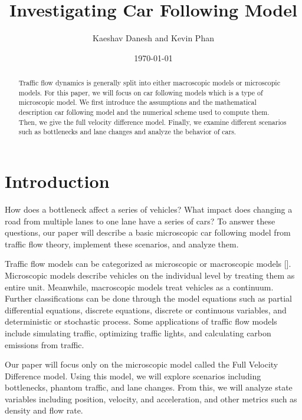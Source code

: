 \documentclass[12pt]{article}
\title{Investigating Car Following Model}
\author{Kaeshav Danesh and Kevin Phan}
\date{\today}
\begin{document}
    \maketitle

    \begin{abstract}
        Traffic flow dynamics is generally split into either macroscopic models or microscopic models. For this paper, we will focus on car following models which is a type of microscopic model. We first introduce the assumptions and the mathematical description car following model and the numerical scheme used to compute them. Then, we give the full velocity difference model. Finally, we examine different scenarios such as bottlenecks and lane changes and analyze the behavior of cars. 
    \end{abstract}

    \newpage

    \tableofcontents

    \newpage

    \section{Introduction}
    How does a bottleneck affect a series of vehicles? What impact does changing a road from multiple lanes to one lane have a series of cars? To answer these questions, our paper will describe a basic microscopic car following model from traffic flow theory, implement these scenarios, and analyze them. 

    Traffic flow models can be categorized as microscopic or macroscopic models [\cite{hisTraffic}]. Microscopic models describe vehicles on the individual level by treating them as entire unit. Meanwhile, macroscopic models treat vehicles as a continuum. Further classifications can be done through the model equations such as partial differential equations, discrete equations, discrete or continuous variables, and deterministic or stochastic process. Some applications of traffic flow models include simulating traffic, optimizing traffic lights, and calculating carbon emissions from traffic. 

    Our paper will focus only on the microscopic model called the Full Velocity Difference model. Using this model, we will explore scenarios including bottlenecks, phantom traffic, and lane changes. From this, we will analyze state variables including position, velocity, and acceleration, and other metrics such as density and flow rate. 
\end{document}
